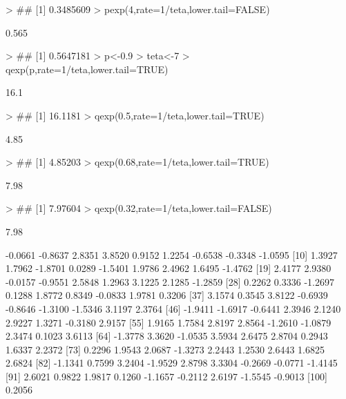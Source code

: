 \documentclass{article}
\begin{document}
\begin{Schunk}
\begin{Sinput}
> ## [1] 0.3485609
> pexp(4,rate=1/teta,lower.tail=FALSE)
\end{Sinput}
\begin{Soutput}
[1] 0.565
\end{Soutput}
\begin{Sinput}
> ## [1] 0.5647181
> p<-0.9
> teta<-7
> qexp(p,rate=1/teta,lower.tail=TRUE)
\end{Sinput}
\begin{Soutput}
[1] 16.1
\end{Soutput}
\begin{Sinput}
> ## [1] 16.1181
> qexp(0.5,rate=1/teta,lower.tail=TRUE)
\end{Sinput}
\begin{Soutput}
[1] 4.85
\end{Soutput}
\begin{Sinput}
> ## [1] 4.85203
> qexp(0.68,rate=1/teta,lower.tail=TRUE)
\end{Sinput}
\begin{Soutput}
[1] 7.98
\end{Soutput}
\begin{Sinput}
> ## [1] 7.97604
> qexp(0.32,rate=1/teta,lower.tail=FALSE)
\end{Sinput}
\begin{Soutput}
[1] 7.98
\end{Soutput}
\begin{Soutput}
  [1] -0.0661 -0.8637  2.8351  3.8520  0.9152  1.2254 -0.6538 -0.3348 -1.0595
 [10]  1.3927  1.7962 -1.8701  0.0289 -1.5401  1.9786  2.4962  1.6495 -1.4762
 [19]  2.4177  2.9380 -0.0157 -0.9551  2.5848  1.2963  3.1225  2.1285 -1.2859
 [28]  0.2262  0.3336 -1.2697  0.1288  1.8772  0.8349 -0.0833  1.9781  0.3206
 [37]  3.1574  0.3545  3.8122 -0.6939 -0.8646 -1.3100 -1.5346  3.1197  2.3764
 [46] -1.9411 -1.6917 -0.6441  2.3946  2.1240  2.9227  1.3271 -0.3180  2.9157
 [55]  1.9165  1.7584  2.8197  2.8564 -1.2610 -1.0879  2.3474  0.1023  3.6113
 [64] -1.3778  3.3620 -1.0535  3.5934  2.6475  2.8704  0.2943  1.6337  2.2372
 [73]  0.2296  1.9543  2.0687 -1.3273  2.2443  1.2530  2.6443  1.6825  2.6824
 [82] -1.1341  0.7599  3.2404 -1.9529  2.8798  3.3304 -0.2669 -0.0771 -1.4145
 [91]  2.6021  0.9822  1.9817  0.1260 -1.1657 -0.2112  2.6197 -1.5545 -0.9013
[100]  0.2056
\end{Soutput}

\end{Schunk}
\end{document}
